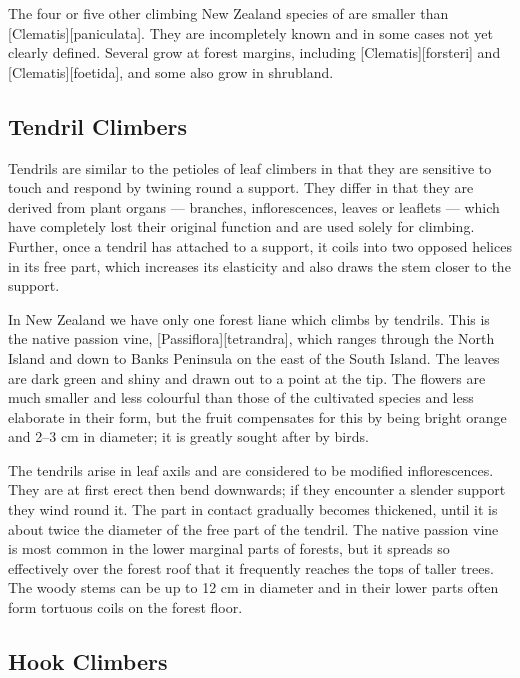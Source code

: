 The four or five other climbing New Zealand species of  are smaller than [Clematis][paniculata].
They are incompletely known and in some cases not yet clearly defined.
Several grow at forest margins, including [Clematis][forsteri] and [Clematis][foetida], and some also grow in shrubland.

\subsection{Tendril Climbers}

Tendrils are similar to the petioles of leaf climbers in that they are sensitive to touch and respond by twining round a support.
They differ in that they are derived from plant organs --- branches, inflorescences, leaves or leaflets --- which have completely lost their original function and are used solely for climbing.
Further, once a tendril has attached to a support, it coils into two opposed helices in its free part, which increases its elasticity and also draws the stem closer to the support.

In New Zealand we have only one forest liane which climbs by tendrils.
This is the native passion vine, [Passiflora][tetrandra], which ranges through the North Island and down to Banks Peninsula on the east of the South Island.
The leaves are dark green and shiny and drawn out to a point at the tip.
The flowers are much smaller and less colourful than those of the cultivated species and less elaborate in their form, but the fruit compensates for this by being bright orange and 2--3 cm in diameter; it is greatly sought after by birds.

The tendrils arise in leaf axils and are considered to be modified inflorescences.
They are at first erect then bend downwards; if they encounter a slender support they wind round it.
The part in contact gradually becomes thickened, until it is about twice the diameter of the free part of the tendril.
The native passion vine is most common in the lower marginal parts of forests, but it spreads so effectively over the forest roof that it frequently reaches the tops of taller trees.
The woody stems can be up to 12 cm in diameter and in their lower parts often form tortuous coils on the forest floor.

\subsection{Hook Climbers}

